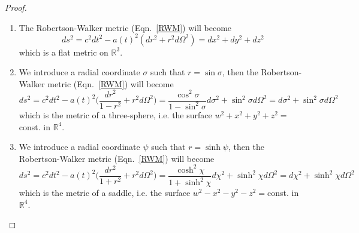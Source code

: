\documentclass[a4paper]{article}
\theoremstyle{new}
\begin{document}
\begin{proof}\leavevmode
\begin{enumerate}
    \item The Robertson-Walker metric (Eqn.~\ref{RWM}) will become
    $$ds^2=c^2dt^2-a(t)^2(dr^2+r^2d\Omega^2)=dx^2+dy^2+dz^2$$
    which is a flat metric on $\mathbb{R}^3$. 
    \item We introduce a radial coordinate $\sigma$ such that $r=\sin\sigma$, then the Robertson-Walker metric (Eqn.~\ref{RWM}) will become
    $$ds^2=c^2dt^2-a(t)^2\bigg(\frac{dr^2}{1-r^2}+r^2d\Omega^2\bigg)=\frac{\cos^2\sigma}{1-\sin^2\sigma}d\sigma^2+\sin^2\sigma d\Omega^2=d\sigma^2+\sin^2\sigma d\Omega^2$$
    which is the metric of a three-sphere, i.e. the surface $w^2+x^2+y^2+z^2=$const. in $\mathbb{R}^4$. 
    \item We introduce a radial coordinate $\psi$ such that $r=\sinh\psi$, then the Robertson-Walker metric (Eqn.~\ref{RWM}) will become
    $$ds^2=c^2dt^2-a(t)^2\bigg(\frac{dr^2}{1+r^2}+r^2d\Omega^2\bigg)=\frac{\cosh^2\chi}{1+\sinh^2\chi}d\chi^2+\sinh^2\chi d\Omega^2=d\chi^2+\sinh^2\chi d\Omega^2$$
    which is the metric of a saddle, i.e. the surface $w^2-x^2-y^2-z^2=$const. in $\mathbb{R}^4$. 
\end{enumerate}
\end{proof}
\end{document}
